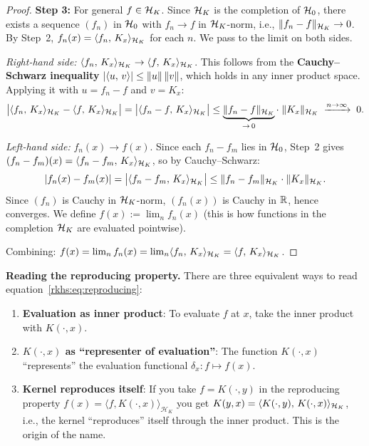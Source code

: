 \begin{notechapter}
\begin{proof}
\textbf{Step 3:} For general $f \in \mathcal{H}_K$. Since $\mathcal{H}_K$
is the completion of $\mathcal{H}_0$, there exists a
sequence $(f_n)$ in $\mathcal{H}_0$ with
$f_n \to f$ in $\mathcal{H}_K$-norm, i.e.,
$\| f_n - f \|_{\mathcal{H}_K} \to 0$. By Step~2,
$f_n(x) = \langle f_n,\, K_x \rangle_{\mathcal{H}_K}$ for each $n$.
We pass to the limit on both sides.

\emph{Right-hand side:}
$\langle f_n,\, K_x \rangle_{\mathcal{H}_K} \to \langle f,\, K_x \rangle_{\mathcal{H}_K}$.
This follows from the \textbf{Cauchy--Schwarz
inequality} $|\langle u,\, v \rangle| \leq \| u \|\,\| v \|$,
which holds in any inner product space. Applying it
with $u = f_n - f$ and $v = K_x$:
\[
\bigl|\langle f_n,\, K_x \rangle_{\mathcal{H}_K}
  - \langle f,\, K_x \rangle_{\mathcal{H}_K}\bigr|
= \bigl|\langle f_n - f,\, K_x \rangle_{\mathcal{H}_K}\bigr|
\leq \underbrace{\| f_n - f \|_{\mathcal{H}_K}}_{\to\, 0}
  \cdot\; \| K_x \|_{\mathcal{H}_K}
\;\xrightarrow{n \to \infty}\; 0.
\]

\emph{Left-hand side:}
$f_n(x) \to f(x)$. Since each $f_n - f_m$ lies in
$\mathcal{H}_0$, Step~2 gives
$(f_n - f_m)(x) = \langle f_n - f_m,\, K_x \rangle_{\mathcal{H}_K}$,
so by Cauchy--Schwarz:
\[
|f_n(x) - f_m(x)|
= \bigl|\langle f_n - f_m,\, K_x \rangle_{\mathcal{H}_K}\bigr|
\leq \| f_n - f_m \|_{\mathcal{H}_K} \cdot \| K_x \|_{\mathcal{H}_K}.
\]
Since $(f_n)$ is Cauchy in $\mathcal{H}_K$-norm,
$(f_n(x))$ is Cauchy in $\mathbb{R}$, hence converges.
We define $f(x) := \lim_n f_n(x)$ (this is how
functions in the completion $\mathcal{H}_K$ are evaluated
pointwise).

Combining: $f(x) = \lim_{n} f_n(x)
= \lim_{n} \langle f_n,\, K_x \rangle_{\mathcal{H}_K}
= \langle f,\, K_x \rangle_{\mathcal{H}_K}$.
\end{proof}

\textbf{Reading the reproducing property.} There are three equivalent
ways to read equation~\eqref{rkhs:eq:reproducing}:
\begin{enumerate}[label=(\alph*)]
  \item \textbf{Evaluation as inner product}: To evaluate $f$ at $x$,
  take the inner product with $K(\cdot, x)$.
  \item \textbf{$K(\cdot, x)$ as ``representer of evaluation''}: The
  function $K(\cdot, x)$ ``represents'' the evaluation functional
  $\delta_x: f \mapsto f(x)$.
  \item \textbf{Kernel reproduces itself}: If you take $f = K(\cdot, y)$
  in the reproducing property
  $f(x) = \langle f, K(\cdot, x) \rangle_{\mathcal{H}_K}$
  you get $K(y,x) = \langle K(\cdot,y),\, K(\cdot,x) \rangle_{\mathcal{H}_K}$, i.e., the
  kernel ``reproduces'' itself through the inner product. This is the
  origin of the name.
\end{enumerate}

\begin{figure}[ht]
\centering
\begin{tikzpicture}[
  >=Stealth,
  point/.style={circle, fill, inner sep=1.5pt},
  every node/.style={font=\small}
]


\end{tikzpicture}
\end{figure}
\end{notechapter}
